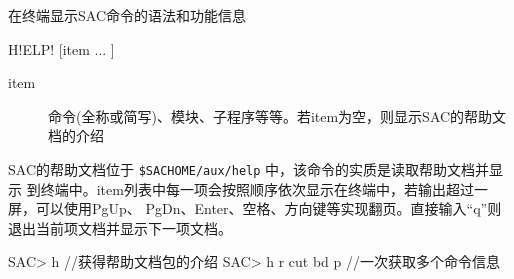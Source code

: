 \label{cmd:help}

在终端显示SAC命令的语法和功能信息

\begin{SACSTX}
H!ELP! [item ... ]
\end{SACSTX}

\begin{description}
\item [item] 命令(全称或简写)、模块、子程序等等。若item为空，则显示SAC的帮助文档的介绍
\end{description}

SAC的帮助文档位于 \verb|$SACHOME/aux/help| 中，该命令的实质是读取帮助文档并显示
到终端中。item列表中每一项会按照顺序依次显示在终端中，若输出超过一屏，可以使用PgUp、
PgDn、Enter、空格、方向键等实现翻页。直接输入``q''则退出当前项文档并显示下一项文档。

\begin{SACCode}
SAC> h                  //获得帮助文档包的介绍
SAC> h r cut bd p       //一次获取多个命令信息
\end{SACCode}
